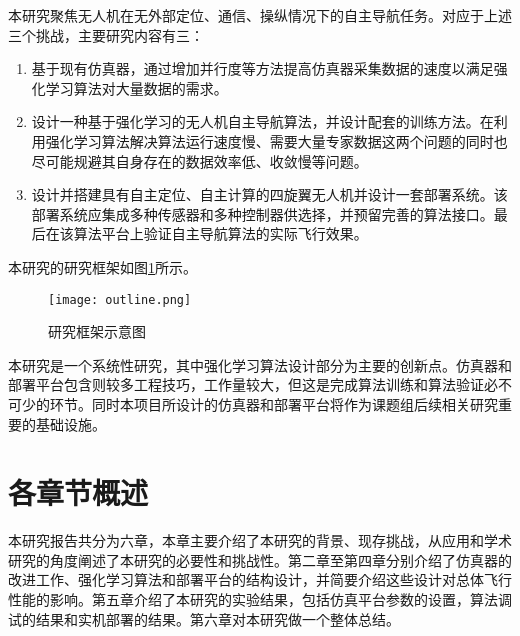 本研究聚焦无人机在无外部定位、通信、操纵情况下的自主导航任务。对应于上述三个挑战，主要研究内容有三：
\begin{enumerate}
  \item 基于现有仿真器，通过增加并行度等方法提高仿真器采集数据的速度以满足强化学习算法对大量数据的需求。
  \item 设计一种基于强化学习的无人机自主导航算法，并设计配套的训练方法。在利用强化学习算法解决算法运行速度慢、需要大量专家数据这两个问题的同时也尽可能规避其自身存在的数据效率低、收敛慢等问题。
  \item 设计并搭建具有自主定位、自主计算的四旋翼无人机并设计一套部署系统。该部署系统应集成多种传感器和多种控制器供选择，并预留完善的算法接口。最后在该算法平台上验证自主导航算法的实际飞行效果。
\end{enumerate}
本研究的研究框架如图\ref{fig_outline}所示。
\begin{figure}
  \centering
  \texttt{[image: outline.png]}
  \label{fig_outline}
  \caption{研究框架示意图}
\end{figure}

本研究是一个系统性研究，其中强化学习算法设计部分为主要的创新点。仿真器和部署平台包含则较多工程技巧，工作量较大，但这是完成算法训练和算法验证必不可少的环节。同时本项目所设计的仿真器和部署平台将作为课题组后续相关研究重要的基础设施。

\section{各章节概述}
\label{outline}
本研究报告共分为六章，本章主要介绍了本研究的背景、现存挑战，从应用和学术研究的角度阐述了本研究的必要性和挑战性。第二章至第四章分别介绍了仿真器的改进工作、强化学习算法和部署平台的结构设计，并简要介绍这些设计对总体飞行性能的影响。第五章介绍了本研究的实验结果，包括仿真平台参数的设置，算法调试的结果和实机部署的结果。第六章对本研究做一个整体总结。






